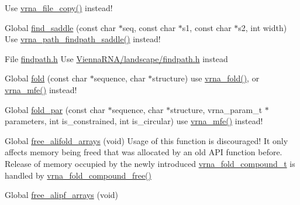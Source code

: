 \begin{DoxyRefList}
%
Use \mbox{\hyperlink{group__file__utils_ga4382a56d2fee9ed738364b99329edc7c}{vrna\+\_\+file\+\_\+copy()}} instead!  
\item[Global \mbox{\hyperlink{group__paths__deprecated_ga4c0dabf032c04eeab9c7370d15db6ad2}{find\+\_\+saddle}} (const char $\ast$seq, const char $\ast$s1, const char $\ast$s2, int width)]\label{deprecated__deprecated000165}%
%
Use \mbox{\hyperlink{group__paths__direct_gad77dbfa125158f534147c0015a849bc3}{vrna\+\_\+path\+\_\+findpath\+\_\+saddle()}} instead! 
\item[File \mbox{\hyperlink{findpath_8h}{findpath.h}} ]\label{deprecated__deprecated000065}%
%
Use \mbox{\hyperlink{landscape_2findpath_8h}{Vienna\+R\+N\+A/landscape/findpath.\+h}} instead  
\item[Global \mbox{\hyperlink{group__mfe__global__deprecated_gaadafcb0f140795ae62e5ca027e335a9b}{fold}} (const char $\ast$sequence, char $\ast$structure)]\label{deprecated__deprecated000067}%
%
use \mbox{\hyperlink{group__mfe__global_ga29a33b2895f4e67b0480271ff289afdc}{vrna\+\_\+fold()}}, or \mbox{\hyperlink{group__mfe__global_gabd3b147371ccf25c577f88bbbaf159fd}{vrna\+\_\+mfe()}} instead! 
\item[Global \mbox{\hyperlink{group__mfe__global__deprecated_ga2bc41df5d71fee6fd8da9904ee65d8fb}{fold\+\_\+par}} (const char $\ast$sequence, char $\ast$structure, vrna\+\_\+param\+\_\+t $\ast$parameters, int is\+\_\+constrained, int is\+\_\+circular)]\label{deprecated__deprecated000066}%
%
use \mbox{\hyperlink{group__mfe__global_gabd3b147371ccf25c577f88bbbaf159fd}{vrna\+\_\+mfe()}} instead! 
\item[Global \mbox{\hyperlink{group__mfe__global__deprecated_ga72095e4554b5d577250ea14c42acc49e}{free\+\_\+alifold\+\_\+arrays}} (void)]\label{deprecated__deprecated000014}%
%
Usage of this function is discouraged! It only affects memory being free\textquotesingle{}d that was allocated by an old A\+PI function before. Release of memory occupied by the newly introduced \mbox{\hyperlink{group__fold__compound_ga1b0cef17fd40466cef5968eaeeff6166}{vrna\+\_\+fold\+\_\+compound\+\_\+t}} is handled by \mbox{\hyperlink{group__fold__compound_ga576a077b418a9c3650e06f8e5d296fc2}{vrna\+\_\+fold\+\_\+compound\+\_\+free()}} 
\item[Global \mbox{\hyperlink{group__part__func__global__deprecated_ga0c0498f35686e26b38ee460d3db1a661}{free\+\_\+alipf\+\_\+arrays}} (void)]\label{deprecated__deprecated000022}%

\end{DoxyRefList}
